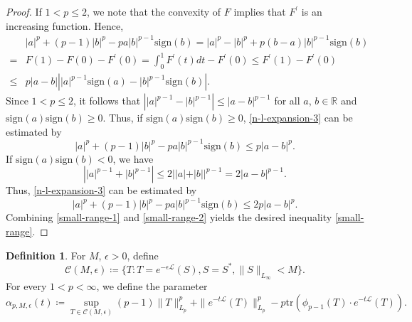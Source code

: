 \documentclass{amsbook}
\theoremstyle{definition}
\newtheorem{definition}[theorem]{Definition}
\theoremstyle{remark}
\numberwithin{section}{chapter}
\numberwithin{equation}{chapter}
\newcommand{\1}{\mathbf{1}}
\begin{document}
\begin{proof}
If $1<p\leq 2$, we note that the convexity of $F$ implies that $F^{\prime}$ is an increasing function. Hence,
\begin{equation}\label{n-l-expansion-3}
\begin{split}
&|a|^{p}+(p-1)|b|^{p}-pa|b|^{p-1}\mathrm{sign}(b)=|a|^p-|b|^p+p(b-a)|b|^{p-1}\mathrm{sign}(b)\\
=&F(1)-F(0)-F^{\prime}(0)=\int_0^1F^{\prime}(t)dt-F^{\prime}(0)\leq F^{\prime}(1)-F^{\prime}(0)\\
\leq &p|a-b|\left||a|^{p-1}\mathrm{sign}(a)-|b|^{p-1}\mathrm{sign}(b)\right|.
\end{split}
\end{equation}
Since $1<p\leq 2$, it follows that $\left||a|^{p-1}-|b|^{p-1}\right|\leq |a-b|^{p-1}$ for all $a$, $b\in \mathbb{R}$ and $\mathrm{sign}(a)\mathrm{sign}(b)\geq0$. Thus, if $\mathrm{sign}(a)\mathrm{sign}(b)\geq0$, \eqref{n-l-expansion-3} can be estimated by
\begin{equation}\label{small-range-1}
|a|^{p}+(p-1)|b|^{p}-pa|b|^{p-1}\mathrm{sign}(b)\leq p|a-b|^{p}.
\end{equation}
If $\mathrm{sign}(a)\mathrm{sign}(b)<0$, we have
\[
\left||a|^{p-1}+|b|^{p-1}\right|\leq 2||a|+|b||^{p-1}=2|a-b|^{p-1}.
\]
Thus, \eqref{n-l-expansion-3} can be estimated by
\begin{equation}\label{small-range-2}
|a|^{p}+(p-1)|b|^{p}-pa|b|^{p-1}\mathrm{sign}(b)\leq 2p|a-b|^{p}.
\end{equation}
Combining \eqref{small-range-1} and \eqref{small-range-2} yields the desired inequality \eqref{small-range}.
\end{proof}

\begin{definition}\label{alpha-p-me}
For $M$, $\epsilon>0$, define
\[
\mathcal{C}(M,\epsilon)\coloneqq \{T: T=e^{-\epsilon\mathcal{L}}(S), S=S^*,\|
S\|_{L_{\infty}}<M\}.
\]
For every $1<p<\infty$, we define the parameter
\[
\alpha_{p, M, \epsilon}(t)\coloneqq\sup_{T \in \mathcal{C}(M, \epsilon)} (p - 1)\|T\|^{p}_{L_{p}} +\|e^{-t\mathcal{L}}(T)\|^{p}_{L_{p}}-p\mathrm{tr}(\phi_{p-1}(T)\cdot e^{-t\mathcal L}(T)).
\]
\end{definition}
\end{document}
